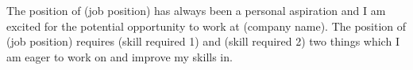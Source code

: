 The position of (job position) has always been a personal aspiration and I am excited for the potential opportunity to work at (company name). The position of (job position) requires (skill required 1) and (skill required 2) two things which I am eager to work on and improve my skills in.
 